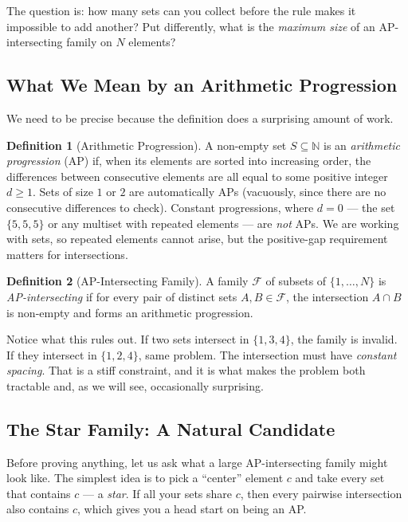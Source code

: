 \documentclass[11pt,a4paper]{article}
\theoremstyle{definition}
\newtheorem{definition}{Definition}[section]
\newcommand{\NN}{\mathbb{N}}
\newcommand{\ground}{\{1,\dots,N\}}
\begin{document}
The question is: how many sets can you collect before the rule makes it impossible
to add another? Put differently, what is the \emph{maximum size} of an
AP-intersecting family on $N$ elements?

\subsection{What We Mean by an Arithmetic Progression}

We need to be precise because the definition does a surprising amount of work.

\begin{definition}[Arithmetic Progression]
A non-empty set $S \subseteq \NN$ is an \emph{arithmetic progression} (AP) if,
when its elements are sorted into increasing order, the differences between
consecutive elements are all equal to some positive integer $d \geq 1$. Sets of
size $1$ or $2$ are automatically APs (vacuously, since there are no consecutive
differences to check). Constant progressions, where $d=0$ --- the set
$\{5,5,5\}$ or any multiset with repeated elements --- are \emph{not} APs. We
are working with sets, so repeated elements cannot arise, but the positive-gap
requirement matters for intersections.
\end{definition}

\begin{definition}[AP-Intersecting Family]
A family $\mathcal{F}$ of subsets of $\ground$ is \emph{AP-intersecting} if for
every pair of distinct sets $A, B \in \mathcal{F}$, the intersection $A \cap B$
is non-empty and forms an arithmetic progression.
\end{definition}

Notice what this rules out. If two sets intersect in $\{1,3,4\}$, the family is
invalid. If they intersect in $\{1,2,4\}$, same problem. The intersection must
have \emph{constant spacing}. That is a stiff constraint, and it is what makes
the problem both tractable and, as we will see, occasionally surprising.

\subsection{The Star Family: A Natural Candidate}

Before proving anything, let us ask what a large AP-intersecting family might look
like. The simplest idea is to pick a ``center'' element $c$ and take every set that
contains $c$ --- a \emph{star}. If all your sets share $c$, then every pairwise
intersection also contains $c$, which gives you a head start on being an AP.
\end{document}

